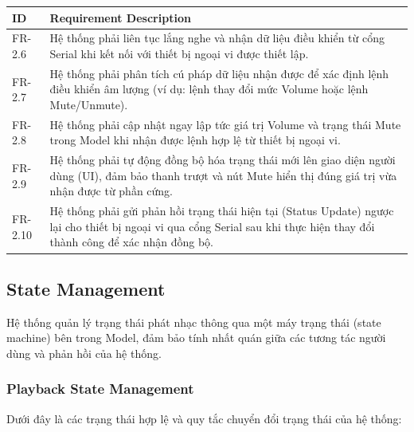 \documentclass{article}
\begin{document}
\begin{center}
\renewcommand{\arraystretch}{1.5}
\begin{tabular}{|l|p{12cm}|}
\hline
\textbf{ID} & \textbf{Requirement Description} \\ \hline
FR-2.6 & Hệ thống phải liên tục lắng nghe và nhận dữ liệu điều khiển từ cổng Serial khi kết nối với thiết bị ngoại vi được thiết lập. \\ \hline
FR-2.7 & Hệ thống phải phân tích cú pháp dữ liệu nhận được để xác định lệnh điều khiển âm lượng (ví dụ: lệnh thay đổi mức Volume hoặc lệnh Mute/Unmute). \\ \hline
FR-2.8 & Hệ thống phải cập nhật ngay lập tức giá trị Volume và trạng thái Mute trong Model khi nhận được lệnh hợp lệ từ thiết bị ngoại vi. \\ \hline
FR-2.9 & Hệ thống phải tự động đồng bộ hóa trạng thái mới lên giao diện người dùng (UI), đảm bảo thanh trượt và nút Mute hiển thị đúng giá trị vừa nhận được từ phần cứng. \\ \hline
FR-2.10 & Hệ thống phải gửi phản hồi trạng thái hiện tại (Status Update) ngược lại cho thiết bị ngoại vi qua cổng Serial sau khi thực hiện thay đổi thành công để xác nhận đồng bộ. \\ \hline
\end{tabular}
\end{center}



\subsection{State Management}
Hệ thống quản lý trạng thái phát nhạc thông qua một máy trạng thái (state machine) bên trong Model, đảm bảo tính nhất quán giữa các tương tác người dùng và phản hồi của hệ thống.

\subsubsection{Playback State Management}
Dưới đây là các trạng thái hợp lệ và quy tắc chuyển đổi trạng thái của hệ thống:
\end{document}

